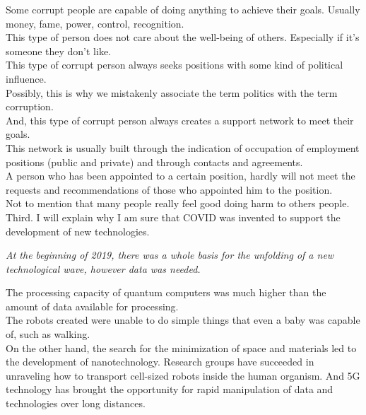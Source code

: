 \documentclass[11pt]{book}
\begin{document}
\noindent Some corrupt people are capable of doing anything to achieve their goals. Usually money, fame, power, control, recognition. \\

\noindent This type of person does not care about the well-being of others. Especially if it's someone they don't like. \\

\noindent This type of corrupt person always seeks positions with some kind of political influence.  \\

\noindent Possibly, this is why we mistakenly associate the term politics with the term corruption. \\

\noindent And, this type of corrupt person always creates a support network to meet their goals. \\

\noindent This network is usually built through the indication of occupation of employment positions (public and private) and through contacts and agreements. \\

\noindent A person who has been appointed to a certain position, hardly will not meet the requests and recommendations of those who appointed him to the position. \\

\noindent Not to mention that many people really feel good doing harm to others people. \\

\noindent Third. I will explain why I am sure that COVID was invented to support the development of new technologies.

\noindent \begin{center} \emph{At the beginning of 2019, there was a whole basis for the unfolding of a new technological wave, however data was needed.} \end{center}

\noindent The processing capacity of quantum computers was much higher than the amount of data available for processing. \\

\noindent The robots created were unable to do simple things that even a baby was capable of, such as walking. \\

\noindent On the other hand, the search for the minimization of space and materials led to the development of nanotechnology. Research groups have succeeded in unraveling how to transport cell-sized robots inside the human organism. And 5G technology has brought the opportunity for rapid manipulation of data and technologies over long distances. \\
\end{document}
